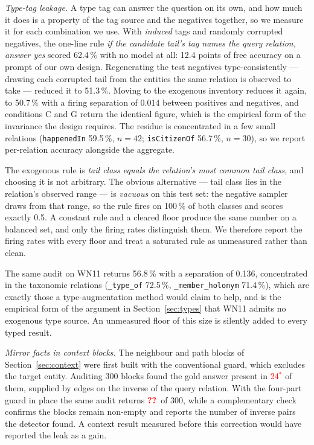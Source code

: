 \documentclass[conference]{IEEEtran}
\newcommand{\pv}[1]{\textcolor{red}{#1\ensuremath{^{\ast}}}}
\newcommand{\pend}{\textcolor{red}{\textbf{??}}}
\begin{document}
\emph{Type-tag leakage.} A type tag can answer the question on its own, and how
much it does is a property of the tag source and the negatives together, so we
measure it for each combination we use. With \emph{induced} tags and randomly
corrupted negatives, the one-line rule \emph{if the candidate tail's tag names
the query relation, answer yes} scored 62.4\,\% with no model at all: 12.4
points of free accuracy on a prompt of our own design. Regenerating the test
negatives type-consistently --- drawing each corrupted tail from the entities
the same relation is observed to take --- reduced it to 51.3\,\%. Moving to the
exogenous inventory reduces it again, to 50.7\,\% with a firing separation of
0.014 between positives and negatives, and conditions C and G return the
identical figure, which is the empirical form of the invariance the design
requires. The residue is concentrated in a few small relations
(\texttt{happenedIn} 59.5\,\%, $n=42$; \texttt{isCitizenOf} 56.7\,\%, $n=30$),
so we report per-relation accuracy alongside the aggregate.

The exogenous rule is \emph{tail class equals the relation's most common tail
class}, and choosing it is not arbitrary. The obvious alternative --- tail class
lies in the relation's observed range --- is \emph{vacuous} on this test set: the
negative sampler draws from that range, so the rule fires on 100\,\% of both
classes and scores exactly 0.5. A constant rule and a cleared floor produce the
same number on a balanced set, and only the firing rates distinguish them. We
therefore report the firing rates with every floor and treat a saturated rule as
unmeasured rather than clean.

The same audit on
WN11 returns 56.8\,\% with a separation of 0.136, concentrated in the taxonomic
relations (\texttt{\_type\_of} 72.5\,\%, \texttt{\_member\_holonym} 71.4\,\%),
which are exactly those a type-augmentation method would claim to help, and is
the empirical form of the argument in Section~\ref{sec:types} that WN11 admits
no exogenous type source. An unmeasured floor of this size is silently added to
every typed result.

\emph{Mirror facts in context blocks.} The neighbour and path blocks of
Section~\ref{sec:context} were first built with the conventional guard, which
excludes the target entity. Auditing 300 blocks found the gold answer present in
\pv{24} of them, supplied by edges on the inverse of the query relation. With the
four-part guard in place the same audit returns \pend\ of 300, while a
complementary check confirms the blocks remain non-empty and reports the number
of inverse pairs the detector found. A context result
measured before this correction would have reported the leak as a gain.
\end{document}
